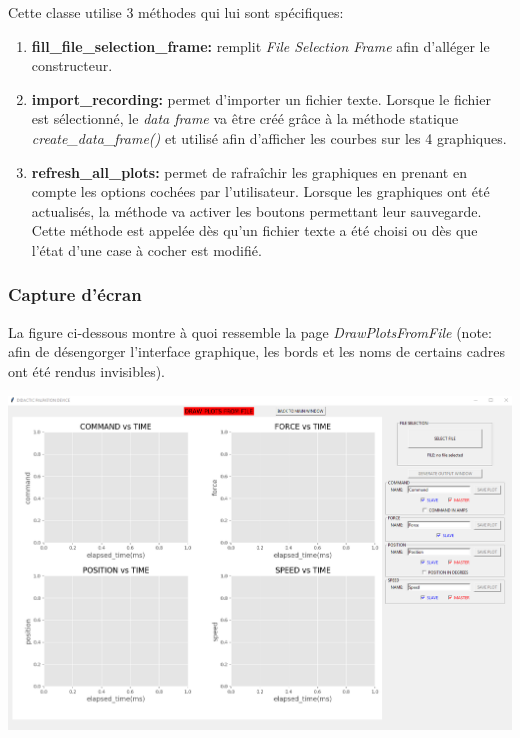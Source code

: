 Cette classe utilise 3 méthodes qui lui sont spécifiques:

\begin{enumerate}
    \item \textbf{fill\_file\_selection\_frame:} remplit \textit{File Selection Frame} afin d'alléger le constructeur.
    
    \item \textbf{import\_recording:} permet d'importer un fichier texte. Lorsque le fichier est sélectionné, le \textit{data frame} va être créé grâce à la méthode statique \textit{create\_data\_frame()} et utilisé afin d'afficher les courbes sur les 4 graphiques.
    
    \item \textbf{refresh\_all\_plots:} permet de rafraîchir les graphiques en prenant en compte les options cochées par l'utilisateur. Lorsque les graphiques ont été actualisés, la méthode va activer les boutons permettant leur sauvegarde. Cette méthode est appelée dès qu'un fichier texte a été choisi ou dès que l'état d'une case à cocher est modifié.
\end{enumerate}

\subsubsection{Capture d'écran}

La figure ci-dessous montre à quoi ressemble la page \textit{DrawPlotsFromFile} (note: afin de désengorger l'interface graphique, les bords et les noms de certains cadres ont été rendus invisibles).

\begin{center}
    \includegraphics[width=16cm]{images/DrawPlotsFromFile-screenshot.png}
\end{center}


